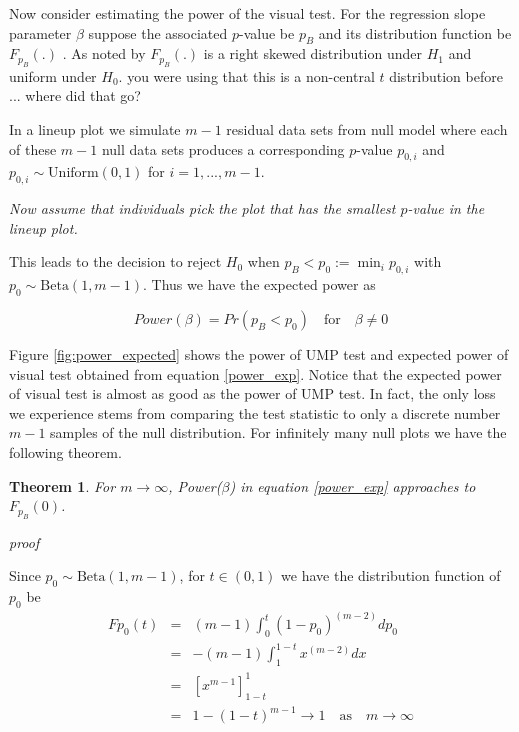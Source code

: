 \documentclass{article}
\newcommand{\blue}[1]{{\color{blue} #1}}
\newtheorem{thm}{Theorem}[section]
\begin{document}

Now consider estimating the power of the visual test. For the regression slope parameter $\beta$ suppose the associated $p$-value be $p_B$ and its distribution function be  $F_{p_B}(.)$ . As noted by \cite{Ruppert:2007} $F_{p_B}(.)$ is a right skewed distribution under $H_1$ and uniform under $H_0$. \blue{you were using that this is a non-central $t$ distribution before ... where did that go?}


 In a lineup plot we simulate $m-1$ residual data sets from null model where each of these $m-1$ null data sets produces a corresponding $p$-value $p_{0,i}$ and $p_{0,i} \sim \text{Uniform}(0,1)$ for $i = 1, ..., m-1$. 

{\it Now assume that individuals pick the plot that has the smallest $p$-value in the lineup plot. }

This leads to the decision to reject $H_0$ when $p_{B} < p_0 := \min_{i} p_{0,i}$ with  $p_0 \sim \text{Beta}(1,m-1)$. 
Thus we have the expected power as 

\begin{equation}\label{power_exp} 
   Power(\beta)=Pr(p_{B} < p_0)  \quad \text{for}  \quad \beta \ne 0
\end{equation}

Figure \ref{fig:power_expected} shows the power of UMP test and expected power of visual test obtained from equation \eqref{power_exp}. Notice that the expected power of visual test is almost as good as the power of UMP test. In fact, the only loss we experience stems from comparing the test statistic to only a discrete number $m-1$ samples of the null distribution. For infinitely many null plots we have the following theorem.

\begin{thm}
 For $m \rightarrow \infty $,  Power($\beta$) in equation \ref{power_exp} approaches to $F_{p_B}(0)$.
\end{thm}
 
{ \em proof}

Since $p_0 \sim \text{Beta}(1,m-1)$,  for $t \in (0,1)$ we have the distribution function of $p_0$ be
\begin{eqnarray*}
F{p_0}(t) &=& (m-1) \int_0^t{(1-p_0)^{(m-2)}dp_0} \\
  &=&  -(m-1) \int_1^{1-t}{x^{(m-2)}dx}\\
  &=& \left[ x^{m-1}\right]^1_{1-t}\\
  &=&1-(1-t)^{m-1} \rightarrow 1 \quad \text{as} \quad m \rightarrow \infty
\end{eqnarray*}
\end{document}

